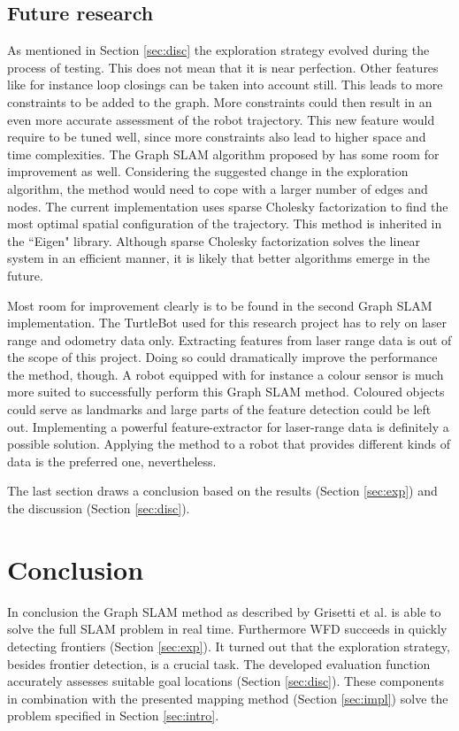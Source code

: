 \documentclass{ba-kecs}
\begin{document}
\subsection{Future research}
As mentioned in Section \ref{sec:disc} the exploration strategy evolved during the process of testing. This does not mean that it is near perfection. Other features like for instance loop closings can be taken into account still. This leads to more constraints to be added to the graph. More constraints could then result in an even more accurate assessment of the robot trajectory. This new feature would require to be tuned well, since more constraints also lead to higher space and time complexities. 
The Graph SLAM algorithm proposed by \citep{Grisetti} has some room for improvement as well. Considering the suggested change in the exploration algorithm, the method would need to cope with a larger number of edges and nodes.
The current implementation uses sparse Cholesky factorization to find the most optimal spatial configuration of the trajectory. This method is inherited in the ``Eigen" library. Although sparse Cholesky factorization solves the linear system in an efficient manner, it is likely that better algorithms emerge in the future.

Most room for improvement clearly is to be found in the second Graph SLAM implementation. The TurtleBot used for this research project has to rely on laser range and odometry data only. Extracting features from laser range data is out of the scope of this project. Doing so could dramatically improve the performance the method, though. 
A robot equipped with for instance a colour sensor is much more suited to successfully perform this Graph SLAM method. Coloured objects could serve as landmarks and large parts of the feature detection could be left out. Implementing a powerful feature-extractor for laser-range data is definitely a possible solution. Applying the method to a robot that provides different kinds of data is the preferred one, nevertheless.

The last section draws a conclusion based on the results (Section \ref{sec:exp}) and the discussion (Section \ref{sec:disc}).
\section{Conclusion}
\label{sec:conc}
In conclusion the Graph SLAM method as described by Grisetti et al. \citep{Grisetti} is able to solve the full SLAM problem in real time. Furthermore WFD succeeds in quickly detecting frontiers (Section \ref{sec:exp}). It turned out that the exploration strategy, besides frontier detection, is a crucial task. The developed evaluation function accurately assesses suitable goal locations (Section \ref{sec:disc}). These components in combination with the presented mapping method (Section \ref{sec:impl}) solve the problem specified in Section \ref{sec:intro}.


\nocite{*}
\onecolumn
\appendix
\end{document}
